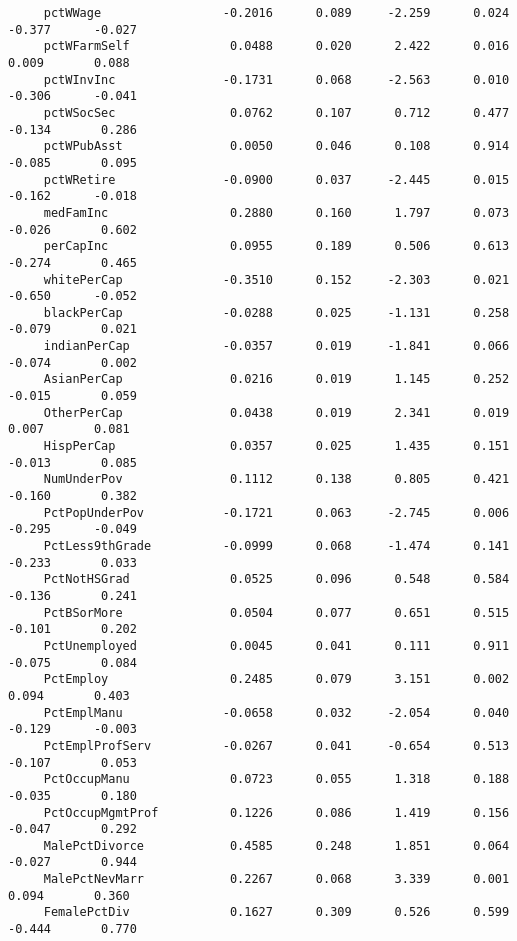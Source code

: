 \documentclass[letterpaper]{article}
\begin{document}
\begin{minipage}{\linewidth}
\begin{Verbatim}
     pctWWage                 -0.2016      0.089     -2.259      0.024      -0.377      -0.027
     pctWFarmSelf              0.0488      0.020      2.422      0.016       0.009       0.088
     pctWInvInc               -0.1731      0.068     -2.563      0.010      -0.306      -0.041
     pctWSocSec                0.0762      0.107      0.712      0.477      -0.134       0.286
     pctWPubAsst               0.0050      0.046      0.108      0.914      -0.085       0.095
     pctWRetire               -0.0900      0.037     -2.445      0.015      -0.162      -0.018
     medFamInc                 0.2880      0.160      1.797      0.073      -0.026       0.602
     perCapInc                 0.0955      0.189      0.506      0.613      -0.274       0.465
     whitePerCap              -0.3510      0.152     -2.303      0.021      -0.650      -0.052
     blackPerCap              -0.0288      0.025     -1.131      0.258      -0.079       0.021
     indianPerCap             -0.0357      0.019     -1.841      0.066      -0.074       0.002
     AsianPerCap               0.0216      0.019      1.145      0.252      -0.015       0.059
     OtherPerCap               0.0438      0.019      2.341      0.019       0.007       0.081
     HispPerCap                0.0357      0.025      1.435      0.151      -0.013       0.085
     NumUnderPov               0.1112      0.138      0.805      0.421      -0.160       0.382
     PctPopUnderPov           -0.1721      0.063     -2.745      0.006      -0.295      -0.049
     PctLess9thGrade          -0.0999      0.068     -1.474      0.141      -0.233       0.033
     PctNotHSGrad              0.0525      0.096      0.548      0.584      -0.136       0.241
     PctBSorMore               0.0504      0.077      0.651      0.515      -0.101       0.202
     PctUnemployed             0.0045      0.041      0.111      0.911      -0.075       0.084
     PctEmploy                 0.2485      0.079      3.151      0.002       0.094       0.403
     PctEmplManu              -0.0658      0.032     -2.054      0.040      -0.129      -0.003
     PctEmplProfServ          -0.0267      0.041     -0.654      0.513      -0.107       0.053
     PctOccupManu              0.0723      0.055      1.318      0.188      -0.035       0.180
     PctOccupMgmtProf          0.1226      0.086      1.419      0.156      -0.047       0.292
     MalePctDivorce            0.4585      0.248      1.851      0.064      -0.027       0.944
     MalePctNevMarr            0.2267      0.068      3.339      0.001       0.094       0.360
     FemalePctDiv              0.1627      0.309      0.526      0.599      -0.444       0.770

\end{Verbatim}
\end{minipage}
\end{document}
